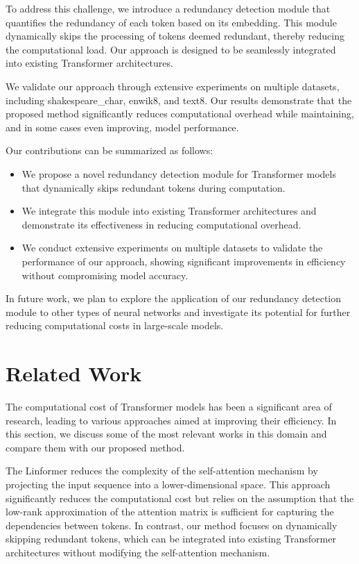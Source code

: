 \documentclass{article} %
\begin{document}
To address this challenge, we introduce a redundancy detection module that quantifies the redundancy of each token based on its embedding. This module dynamically skips the processing of tokens deemed redundant, thereby reducing the computational load. Our approach is designed to be seamlessly integrated into existing Transformer architectures.

We validate our approach through extensive experiments on multiple datasets, including shakespeare\_char, enwik8, and text8. Our results demonstrate that the proposed method significantly reduces computational overhead while maintaining, and in some cases even improving, model performance.

Our contributions can be summarized as follows:
\begin{itemize}
    \item We propose a novel redundancy detection module for Transformer models that dynamically skips redundant tokens during computation.
    \item We integrate this module into existing Transformer architectures and demonstrate its effectiveness in reducing computational overhead.
    \item We conduct extensive experiments on multiple datasets to validate the performance of our approach, showing significant improvements in efficiency without compromising model accuracy.
\end{itemize}

In future work, we plan to explore the application of our redundancy detection module to other types of neural networks and investigate its potential for further reducing computational costs in large-scale models.

\section{Related Work}
\label{sec:related}

The computational cost of Transformer models has been a significant area of research, leading to various approaches aimed at improving their efficiency. In this section, we discuss some of the most relevant works in this domain and compare them with our proposed method.

The Linformer \citep{Wang2020LinformerSW} reduces the complexity of the self-attention mechanism by projecting the input sequence into a lower-dimensional space. This approach significantly reduces the computational cost but relies on the assumption that the low-rank approximation of the attention matrix is sufficient for capturing the dependencies between tokens. In contrast, our method focuses on dynamically skipping redundant tokens, which can be integrated into existing Transformer architectures without modifying the self-attention mechanism.
\end{document}
